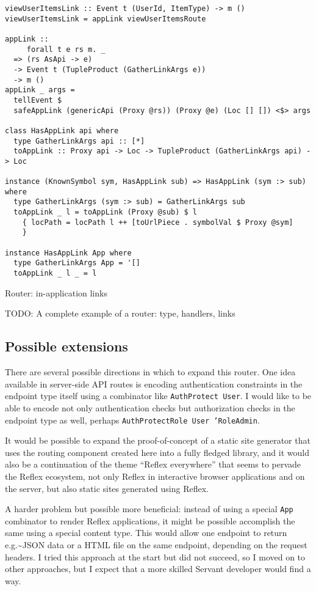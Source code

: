 \documentclass[english,odsaz]{fitthesis}
\begin{document}
\begin{listing}[htbp]
\begin{verbatim}
viewUserItemsLink :: Event t (UserId, ItemType) -> m ()
viewUserItemsLink = appLink viewUserItemsRoute

appLink ::
     forall t e rs m. _
  => (rs AsApi -> e)
  -> Event t (TupleProduct (GatherLinkArgs e))
  -> m ()
appLink _ args =
  tellEvent $
  safeAppLink (genericApi (Proxy @rs)) (Proxy @e) (Loc [] []) <$> args

class HasAppLink api where
  type GatherLinkArgs api :: [*]
  toAppLink :: Proxy api -> Loc -> TupleProduct (GatherLinkArgs api) -> Loc

instance (KnownSymbol sym, HasAppLink sub) => HasAppLink (sym :> sub) where
  type GatherLinkArgs (sym :> sub) = GatherLinkArgs sub
  toAppLink _ l = toAppLink (Proxy @sub) $ l
    { locPath = locPath l ++ [toUrlPiece . symbolVal $ Proxy @sym]
    }

instance HasAppLink App where
  type GatherLinkArgs App = '[]
  toAppLink _ l _ = l
\end{verbatim}
\caption{Router: in-application links \label{router-link}}
\end{listing}

TODO: A complete example of a router: type, handlers, links

\subsection{Possible extensions}
\label{sec:org0086806}
There are several possible directions in which to expand this router. One idea
available in server-side API routes is encoding authentication constraints in
the endpoint type itself using a combinator like \texttt{AuthProtect User}. I would like
to be able to encode not only authentication checks but authorization checks in
the endpoint type as well, perhaps \texttt{AuthProtectRole User 'RoleAdmin}.

It would be possible to expand the proof-of-concept of a static site generator
that uses the routing component created here into a fully fledged library, and
it would also be a continuation of the theme ``Reflex everywhere'' that seems to
pervade the Reflex ecosystem, not only Reflex in interactive browser
applications and on the server, but also static sites generated using Reflex.

A harder problem but possible more beneficial: instead of using a special \texttt{App}
combinator to render Reflex applications, it might be possible accomplish the
same using a special content type. This would allow one endpoint to return
e.g.\textasciitilde{}JSON data or a HTML file on the same endpoint, depending on the request
headers. I tried this approach at the start but did not succeed, so I moved on
to other approaches, but I expect that a more skilled Servant developer would
find a way.
\end{document}
